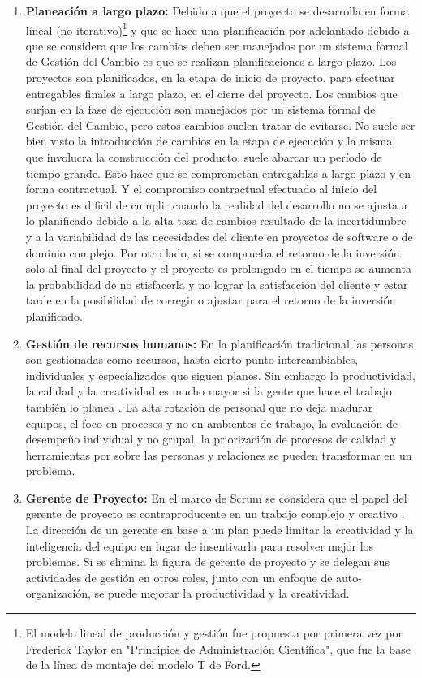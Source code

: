 \begin{enumerate}
\item \textbf{Planeación a largo plazo:} Debido a que el proyecto se desarrolla en forma lineal (no iterativo)\footnote{El modelo lineal de producción y gestión fue propuesta por primera vez por Frederick Taylor en "Principios de Administración Científica", que fue la base de la línea de montaje del modelo T de Ford.} y que se hace una planificación por adelantado debido a que se considera que los cambios deben ser manejados por un sistema formal de Gestión del Cambio es que se realizan planificaciones a largo plazo. Los proyectos son planificados, en la etapa de inicio de proyecto, para efectuar entregables finales a largo plazo, en el cierre del proyecto. Los cambios que surjan en la fase de ejecución son manejados por un sistema formal de Gestión del Cambio, pero estos cambios suelen tratar de evitarse. No suele ser bien visto la introducción de cambios en la etapa de ejecución y la misma, que involucra la construcción del producto, suele abarcar un período de tiempo grande. Esto hace que se comprometan entregablas a largo plazo y en forma contractual. Y el compromiso contractual efectuado al inicio del proyecto es dificil de cumplir cuando la realidad del desarrollo no se ajusta a lo planificado debido a la alta tasa de cambios resultado de la incertidumbre y a la variabilidad de las necesidades del cliente en proyectos de software o de dominio complejo. Por otro lado, si se comprueba el retorno de la inversión solo al final del proyecto y el proyecto es prolongado en el tiempo se aumenta la probabilidad de no stisfacerla y no lograr la satisfacción del cliente y estar tarde en la posibilidad de corregir o ajustar para el retorno de la inversión planificado.

\item \textbf{Gestión de recursos humanos:} En la planificación tradicional las personas son gestionadas como recursos, hasta cierto punto intercambiables, individuales y especializados que siguen planes. Sin embargo la productividad, la calidad y la creatividad es mucho mayor si la gente que hace el trabajo también lo planea \cite{Ken-Schwaber-2011}. La alta rotación de personal que no deja madurar equipos, el foco en procesos y no en ambientes de trabajo, la evaluación de desempeño individual y no grupal, la priorización de procesos de calidad y herramientas por sobre las personas y relaciones se pueden transformar en un problema.

\item \textbf{Gerente de Proyecto:} En el marco de Scrum se considera que el papel del gerente de proyecto es contraproducente en un trabajo complejo y creativo \cite{Ken-Schwaber-2011}. La dirección de un gerente en base a un plan puede limitar la creatividad y la inteligencia del equipo en lugar de insentivarla para resolver mejor los problemas. Si se elimina la figura de gerente de proyecto y se delegan sus actividades de gestión en otros roles, junto con un enfoque de auto-organización, se puede mejorar la productividad y la creatividad.


\end{enumerate}
